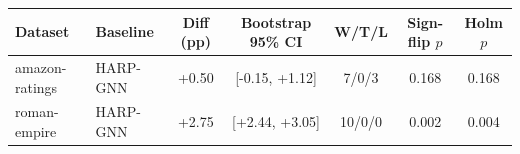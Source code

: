 \begin{tabular}{llccccc}
\toprule
Dataset & Baseline & Diff (pp) & Bootstrap 95\% CI & W/T/L & Sign-flip $p$ & Holm $p$ \\
\midrule
amazon-ratings & HARP-GNN & +0.50 & [-0.15, +1.12] & 7/0/3 & 0.168 & 0.168 \\
roman-empire & HARP-GNN & +2.75 & [+2.44, +3.05] & 10/0/0 & 0.002 & 0.004 \\
\bottomrule
\end{tabular}

